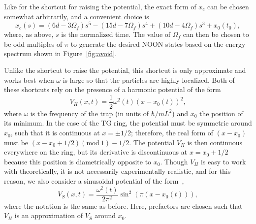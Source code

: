 Like for the shortcut for raising the potential, the exact form of $x_c$ can be chosen somewhat arbitrarily, and a convenient choice is
\begin{equation}
 x_c(s)= (6 d -3 \Omega_f )s^5 - (15 d-7 \Omega_f )s^4+(10d-4 \Omega_f) s^3 + x_0(t_0),
\end{equation}
where, as above, $s$ is the normalized time.
The value of $\Omega_f$ can then be chosen to be odd multiples of $\pi$ to generate the desired NOON states based on the energy spectrum shown in Figure~\ref{fig:avoid}.

Unlike the shortcut to raise the potential, this shortcut is only approximate and works best when $\omega$ is large so that the particles are highly localized.
Both of these shortcuts rely on the presence of a harmonic potential of the form
\begin{equation}
 V_{H}(x,t)=\frac 1 2 \omega^2(t) \left( x-x_0(t)\right)^2, 
\end{equation}
where  $\omega$ is the frequency of the trap (in units of $\hbar/mL^2$) and $x_0$ the position of its minimum.
In the case of the TG ring, the potential must be symmetric around $x_0$, such that it is continuous at $x=\pm 1/2$; therefore, the real form of $(x-x_0)$ must be $(x-x_0+1/2)(\mathrm{mod~} 1)-1/2$.
The potential $V_H$ is then continuous everywhere on the ring, but its derivative is discontinuous at $x=x_0+1/2$ because this position is diametrically opposite to $x_0$.
Though $V_H$ is easy to work with theoretically, it is not necessarily experimentally realistic, and for this reason, we also consider a sinusoidal potential of the form~\cite{phelan2013,masuda2014},
\begin{equation}
 V_{S}(x,t)= \frac{\omega^2(t)}{2 \pi^2} \sin^2 \left(\pi \left( x-x_0(t)\right) \right) ,
\end{equation}
where the notation is the same as before. 
Here, prefactors are chosen such that $V_{H}$ is an approximation of $V_S$ around $x_0$.


